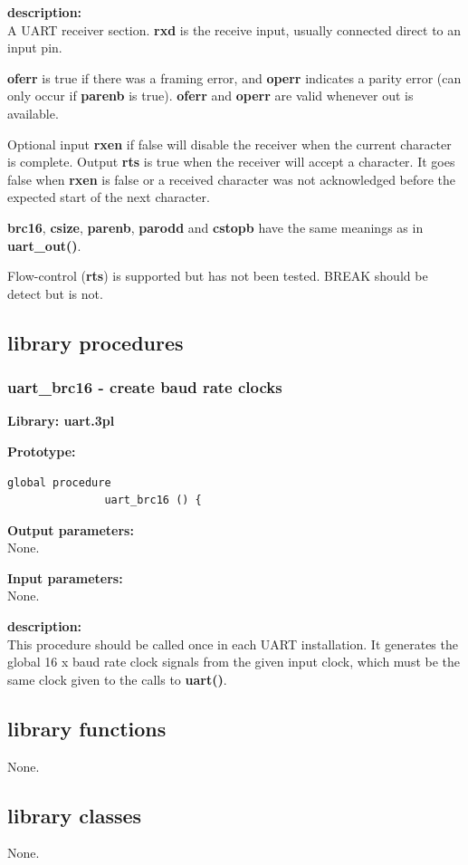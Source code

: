             {\bf description:} \\
            A UART receiver section. {\bf rxd} is the receive input, usually
            connected direct to an input pin.

            {\bf oferr} is true if there was a framing error, and {\bf operr} indicates
            a parity error (can only occur if {\bf parenb} is true). {\bf oferr} and
            {\bf operr} are valid whenever out is available.

            Optional input {\bf rxen} if false will disable the receiver when the
            current character is complete. Output {\bf rts} is true when the
            receiver will accept a character. It goes false when {\bf rxen} is
            false or a received character was not acknowledged before the
            expected start of the next character.

            {\bf brc16}, {\bf csize}, {\bf parenb}, {\bf parodd} and {\bf cstopb} have the same
            meanings as in {\bf uart\_out()}.

            Flow-control ({\bf rts}) is supported but has not been tested.
            BREAK should be detect but is not.






    \subsection{library procedures}
    
        \subsubsection{uart\_brc16 - create baud rate clocks}\label{sec:lpuartbrc16}

            {\bf Library: uart.3pl}

            {\bf Prototype:} \\
            \vsp
            \begin{lstlisting}[gobble=12, language=threepl]
               global procedure
               uart_brc16 () {
             \end{lstlisting}

            {\bf Output parameters:} \\
            None.

            {\bf Input parameters:} \\
            None.
       
            {\bf description:} \\
            This procedure should be called once in each UART installation.
            It generates the global 16 x baud rate clock signals from the
            given input clock, which must be the same clock given to the
            calls to {\bf uart()}.


    \subsection{library functions}
    
        None.


    \subsection{library classes}
    
        None.
